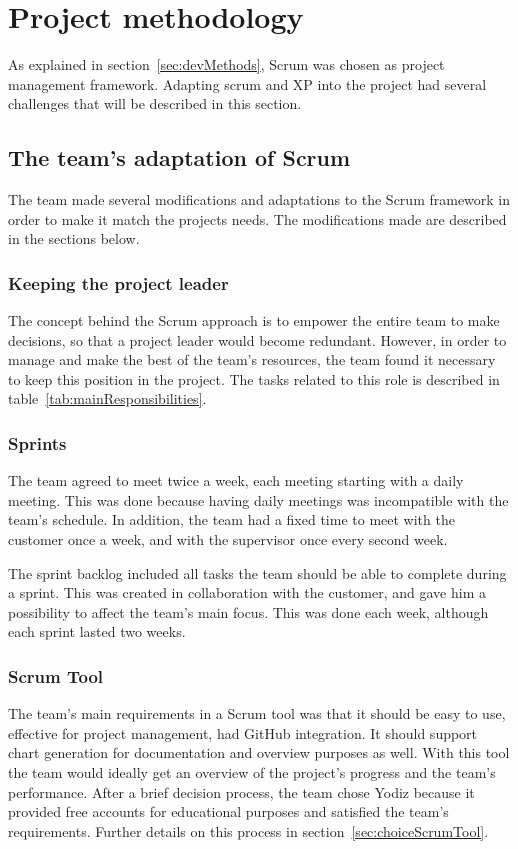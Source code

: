 \newpage
\section{Project methodology}
\label{sec:scrumDevProcess}

As explained in section~\ref{sec:devMethods}, Scrum was chosen as project management framework. Adapting scrum and XP into the project had several challenges that will be described in this section.

\subsection{The team's adaptation of Scrum}
The team made several modifications and adaptations to the Scrum framework in order to make it match the projects needs. The modifications made are described in the sections below.

\subsubsection{Keeping the project leader}
The concept behind the Scrum approach is to empower the entire team to make decisions, so that a project leader would become redundant. However, in order to manage and make the best of the team's resources, the team found it necessary to keep this position in the project. The tasks related to this role is described in table~\ref{tab:mainResponsibilities}.

\subsubsection{Sprints}
The team agreed to meet twice a week, each meeting starting with a daily meeting. This was done because having daily meetings was incompatible with the team's schedule. In addition, the team had a fixed time to meet with the customer once a week, and with the supervisor once every second week.

The sprint backlog included all tasks the team should be able to complete during a sprint. This was created in collaboration with the customer, and gave him a possibility to affect the team's main focus. This was done each week, although each sprint lasted two weeks.

\subsubsection{Scrum Tool}
\label{sec:scrumtool}
The team's main requirements in a Scrum tool was that it should be easy to use, effective for project management, had GitHub integration. It should support chart generation for documentation and overview purposes as well. With this tool the team would ideally get an overview of the project's progress and the team's performance. After a brief decision process, the team chose Yodiz because it provided free accounts for educational purposes and satisfied the team's requirements. Further details on this process in section~\ref{sec:choiceScrumTool}.

